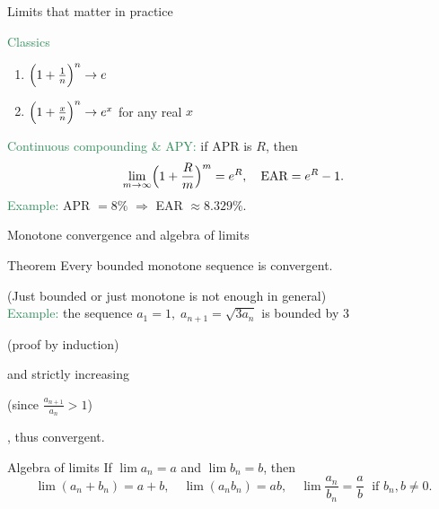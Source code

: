\documentclass[11pt,aspectratio=169]{beamer}
\begin{document}
\begin{frame}{Limits that matter in practice}

\textcolor{SeaGreen}{Classics} 
\begin{enumerate}
\item $\Bigl(1+\frac{1}{n}\Bigr)^n \to e$
\item $\Bigl(1+\frac{x}{n}\Bigr)^n \to e^{x}$ for any real $x$
\end{enumerate}

\textcolor{SeaGreen}{Continuous compounding \& APY:} if APR is $R$, then
\[
\lim_{m\to\infty}\Bigl(1+\frac{R}{m}\Bigr)^m=e^R,\quad
\text{EAR}=e^R-1.
\]
\textcolor{SeaGreen}{Example:} APR $=8\%$ $\Rightarrow$ EAR $\approx 8.329\%$.
\end{frame}

\begin{frame}{Monotone convergence and algebra of limits}
\begin{alertblock}{Theorem}
Every bounded monotone sequence is convergent.	
\end{alertblock}
{\small (Just bounded or just monotone is not enough in general) }\\[3mm]
\textcolor{SeaGreen}{Example:} the sequence $a_1=1, \; a_{n+1}=\sqrt{3a_n}$ is bounded by $3$ \begin{tiny} (proof by induction) \end{tiny} and strictly increasing \begin{tiny} (since $\frac{a_{n+1}}{a_n}>1$)\end{tiny}, thus convergent.\\[3mm]
\begin{block}{Algebra of limits}
If $\lim a_n=a$ and $\lim b_n=b$, then
\[
\lim (a_n+b_n)=a+b,\quad 
\lim (a_n b_n)=ab,\quad 
\lim \frac{a_n}{b_n}=\frac{a}{b} \;\text{ if }b_n,b\neq 0.
\]	
\end{block}
\end{frame}
\end{document}
